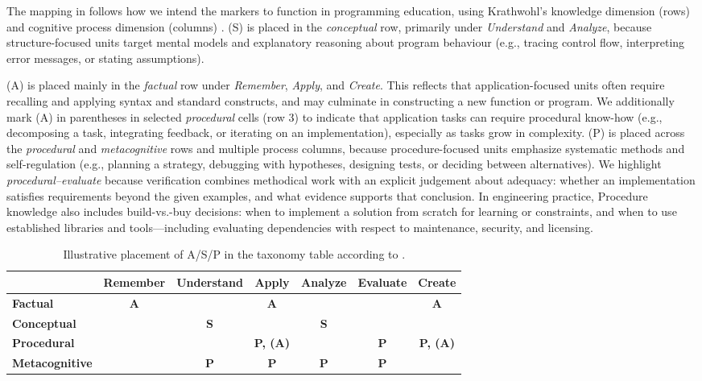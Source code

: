 \documentclass{article}
\begin{document}
The mapping in  follows how we intend the markers to function in programming education, using Krathwohl's knowledge dimension (rows) and cognitive process dimension (columns) \citep{Krathwohl2002}. (S) is placed in the \emph{conceptual} row, primarily under \emph{Understand} and \emph{Analyze}, because structure-focused units target mental models and explanatory reasoning about program behaviour (e.g., tracing control flow, interpreting error messages, or stating assumptions).\par
(A) is placed mainly in the \emph{factual} row under \emph{Remember}, \emph{Apply}, and \emph{Create}. This reflects that application-focused units often require recalling and applying syntax and standard constructs, and may culminate in constructing a new function or program. We additionally mark (A) in parentheses in selected \emph{procedural} cells (row 3) to indicate that application tasks can require procedural know-how (e.g., decomposing a task, integrating feedback, or iterating on an implementation), especially as tasks grow in complexity.
(P) is placed across the \emph{procedural} and \emph{metacognitive} rows and multiple process columns, because procedure-focused units emphasize systematic methods and self-regulation (e.g., planning a strategy, debugging with hypotheses, designing tests, or deciding between alternatives). We highlight \emph{procedural--evaluate} because verification combines methodical work with an explicit judgement about adequacy: whether an implementation satisfies requirements beyond the given examples, and what evidence supports that conclusion.
In engineering practice, Procedure knowledge also includes build-vs.-buy decisions: when to implement a solution from scratch for learning or constraints, and when to use established libraries and tools---including evaluating dependencies with respect to maintenance, security, and licensing.

\begin{table}[hbt!]
  \centering
  \small
  \setlength{\tabcolsep}{5pt}
  \renewcommand{\arraystretch}{1.15}
  \caption{Illustrative placement of A/S/P in the taxonomy table according to \citep{Krathwohl2002}.}
  \label{tab:asv-bloom}
  \begin{tabular}{@{}lcccccc@{}}
  \toprule
   & \textbf{Remember} & \textbf{Understand} & \textbf{Apply} & \textbf{Analyze} & \textbf{Evaluate} & \textbf{Create} \\
  \midrule
  \textbf{Factual}        & \textbf{A} &  & \textbf{A}  &  &  & \textbf{A}  \\
  \textbf{Conceptual}     &  & \textbf{S} &  & \textbf{S} &  &  \\
  \textbf{Procedural}     &  &  & \textbf{P, (A)} &  & \textbf{P} & \textbf{P, (A)} \\
  \textbf{Metacognitive}  &  & \textbf{P} & \textbf{P} & \textbf{P} & \textbf{P} &  \\
  \bottomrule
  \end{tabular}
  \end{table}
\end{document}
